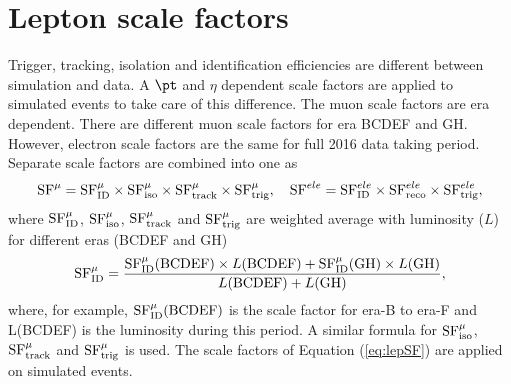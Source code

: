 \section{Lepton scale factors}
\label{s:lepton_sf}
Trigger, tracking, isolation and identification efficiencies are different between simulation and data.
A $\pt$ and $\eta$ dependent scale factors are applied to simulated events to take care of this 
difference. The muon scale factors are era dependent. There are different muon scale factors for era 
BCDEF and GH. However, electron scale factors are the same for full 2016 data taking period.
Separate scale factors are combined into one as
\begin{equation}
 \rm {SF}^\mu = \rm {SF}^\mu_{\rm {ID}}\times \rm {SF}^\mu_{\rm {iso}}\times \rm {SF}^\mu_{\rm {track}}\times \rm {SF}^\mu_{\rm {trig}}, \quad
 \rm {SF}^{ele} = \rm {SF}^{ele}_{\rm {ID}}\times \rm {SF}^{ele}_{\rm {reco}}\times \rm {SF}^{ele}_{\rm {trig}},
\label{eq:lepSF}
\end{equation}
where $\rm {SF}^\mu_{\rm {ID}}$, $\rm {SF}^\mu_{\rm {iso}}$, $\rm {SF}^\mu_{\rm {track}}$ and $\rm {SF}^\mu_{\rm {trig}}$ are weighted
average with luminosity ($L$) for different eras (BCDEF and GH) \eg 
\begin{equation}
 \rm {SF}^\mu_{\rm {ID}}=\frac{\rm {SF}^\mu_{\rm {ID}}({\rm {BCDEF}})\times L({\rm {BCDEF}})+\rm {SF}^\mu_{\rm {ID}}({\rm {GH}})\times L({\rm {GH}})}
 {L({\rm {BCDEF}})+L({\rm {GH}})},
\end{equation}
where, for example, $\rm {SF}^\mu_{\rm {ID}}({\rm {BCDEF}})$ is the scale factor for 
era-B to era-F and L({\rm {BCDEF}}) is the luminosity during this period. A similar formula 
for $\rm {SF}^\mu_{\rm {iso}}$, $\rm {SF}^\mu_{\rm {track}}$ and $\rm {SF}^\mu_{\rm {trig}}$ is used. The scale 
factors of Equation (\ref{eq:lepSF}) are applied on simulated events. 


